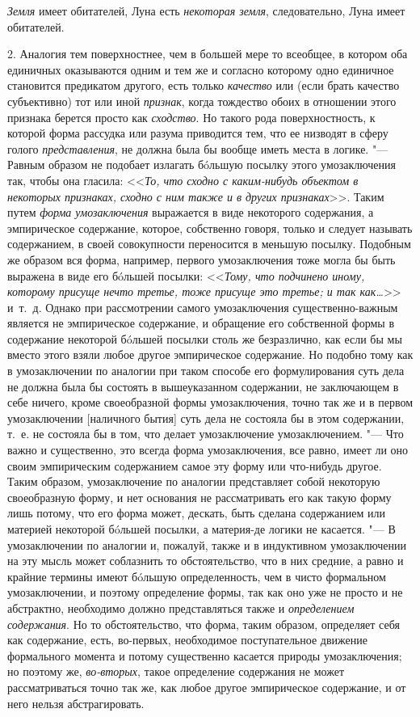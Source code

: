 {\em Земля} имеет обитателей,
Луна есть {\em некоторая земля},
следовательно, Луна имеет обитателей.

2. Аналогия тем поверхностнее, чем в большей мере то всеобщее,
в котором оба единичных оказываются одним и тем же и согласно которому одно
единичное становится предикатом другого, есть только
{\em качество} или (если
брать качество субъективно) тот или иной
{\em признак}, когда
тождество обоих в отношении этого признака берется просто как
{\em сходство}. Но такого
рода поверхностность, к которой форма рассудка или разума приводится тем,
что ее низводят в сферу голого
{\em представления}, не
должна была бы вообще иметь места в логике. "--- Равным
образом не подобает излагать бóльшую посылку этого умозаключения так, чтобы
она гласила: <<{\em То, что сходно с
каким-нибудь объектом в некоторых признаках, сходно с ним также и в других
признаках}>>. Таким путем
{\em форма умозаключения}
выражается в виде некоторого содержания, а эмпирическое
содержание, которое, собственно говоря, только и следует называть
содержанием, в своей совокупности переносится в меньшую посылку. Подобным
же образом вся форма, например, первого умозаключения тоже могла бы быть
выражена в виде его бóльшей посылки:
<<{\em Тому, что подчинено иному, которому присуще нечто третье,
тоже присуще это третье; и так как…}>> и~т.~д. Однако при рассмотрении самого
умозаключения существенно-важным является не эмпирическое содержание, и
обращение его собственной формы в содержание некоторой бóльшей посылки
столь же безразлично, как если бы мы вместо этого взяли
любое другое эмпирическое содержание. Но подобно тому как в умозаключении
по аналогии при таком способе его формулирования суть дела не должна была
бы состоять в вышеуказанном содержании, не заключающем в себе ничего, кроме
своеобразной формы умозаключения, точно так же и в первом умозаключении
[наличного бытия] суть дела не состояла бы в этом содержании, т.~е. не
состояла бы в том, что делает умозаключение умозаключением. "---
Что важно и существенно, это всегда форма умозаключения, все
равно, имеет ли оно своим эмпирическим содержанием самое эту форму или
что-нибудь другое. Таким образом, умозаключение по аналогии представляет
собой некоторую своеобразную форму, и нет основания не рассматривать его
как такую форму лишь потому, что его форма может, дескать, быть сделана
содержанием или материей некоторой бóльшей посылки, а материя-де логики не
касается. "--- В умозаключении по аналогии и, пожалуй, также и
в индуктивном умозаключении на эту мысль может соблазнить то
обстоятельство, что в них средние, а равно и крайние термины имеют бóльшую
определенность, чем в чисто формальном умозаключении, и поэтому определение
формы, так как оно уже не просто и не абстрактно, необходимо должно
представляться также и {\em определением
содержания}. Но то обстоятельство, что форма, таким образом,
определяет себя как содержание, есть, во-первых, необходимое поступательное
движение формального момента и потому существенно касается природы
умозаключения; но поэтому же,
{\em во-вторых}, такое
определение содержания не может рассматриваться точно так же, как любое
другое эмпирическое содержание, и от него нельзя абстрагировать.

